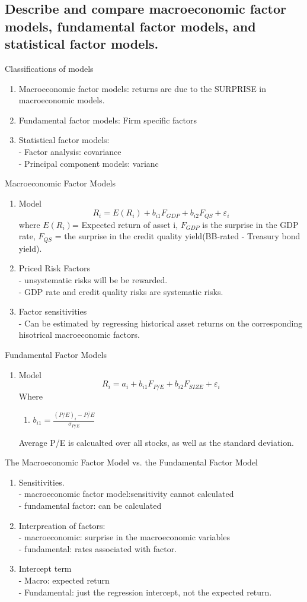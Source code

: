 \documentclass{article}
\newcommand{\be}{\begin{enumerate}}
\newcommand{\ee}{\end{enumerate}}
\begin{document}
\subsection{Describe and compare macroeconomic factor models, fundamental factor models, and
statistical factor models.}
Classifications of models
\be
    \item Macroeconomic factor models: returns are due to the SURPRISE in macroeconomic models.
    \item Fundamental factor models: Firm specific factors
    \item Statistical factor models: 
        \\ - Factor analysis: covariance
        \\ - Principal component models: varianc
\ee
Macroeconomic Factor Models
\be
    \item Model
    $$
        R_i = E(R_i) + b_{i1}F_{GDP} + b_{i2}F_{QS} + \varepsilon_i
    $$
    where $E(R_i)$= Expected return of asset i, $F_{GDP}$ is the surprise in the GDP rate,
    $F_{QS}$ = the surprise in the credit quality yield(BB-rated - Treasury bond yield).
    \item Priced Risk Factors
        \\ - unsystematic risks will be be rewarded.
        \\ - GDP rate and credit quality risks are systematic risks.
    \item Factor sensitivities
        \\ - Can be estimated by regressing historical asset returns on the corresponding hisotrical
        macroeconomic factors.
\ee
Fundamental Factor Models
\be
    \item Model
     $$
        R_i = a_i + b_{i1}F_{P/E}+b_{i2}F_{SIZE}+\varepsilon_i
    $$   
    Where
    \be
        \item $b_{i1}=\frac{(P/E)_i-\overline{P/E}}{\sigma_{P/E}}$
    \ee
    Average P/E is calcualted over all stocks, as well as the standard deviation.
\ee
The Macroeconomic Factor Model vs. the Fundamental Factor Model
\be
    \item Sensitivities. 
        \\ - macroeconomic factor model:sensitivity cannot calculated
        \\ - fundamental factor: can be calculated
    \item Interpreation of factors:
        \\ - macroeconomic: surprise in the macroeconomic variables
        \\ - fundamental: rates associated with factor.
    \item Intercept term
        \\ - Macro: expected return
        \\ - Fundamental: just the regression intercept, not the expected return.
\ee
\end{document}
